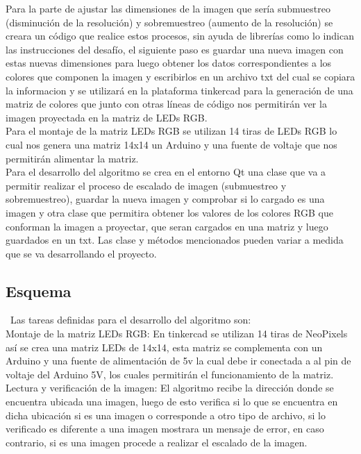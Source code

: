 \documentclass{article}
\begin{document}
Para la parte de ajustar las dimensiones de la imagen que sería submuestreo (disminución de la resolución) y sobremuestreo (aumento de la resolución) se creara un código que realice estos procesos, sin ayuda de librerías como lo indican las instrucciones del desafío, el siguiente paso es guardar una nueva imagen con estas nuevas dimensiones para luego obtener los datos correspondientes a los colores que componen la imagen y escribirlos en un archivo txt del cual se copiara la informacion y se  utilizará en la plataforma tinkercad para la generación de una matriz de colores que junto con otras líneas de código nos permitirán ver la imagen proyectada en la matriz de LEDs RGB.\\

Para el montaje de la matriz LEDs RGB se utilizan 14 tiras de LEDs RGB lo cual nos genera una matriz 14x14 un Arduino y una fuente de voltaje que nos permitirán alimentar la matriz.\\
Para el desarrollo del algoritmo se crea en el entorno Qt una clase que va a permitir realizar el proceso de escalado de imagen (submuestreo y sobremuestreo), guardar la nueva imagen y comprobar si lo cargado es una imagen y otra clase que permitira obtener los valores de los colores RGB que conforman la imagen a proyectar, que seran cargados en una matriz y luego guardados en un txt. Las clase y métodos mencionados pueden variar a medida que se va desarrollando el proyecto.

\subsection{Esquema}
\
Las tareas definidas para el desarrollo del algoritmo son:\\
Montaje de la matriz LEDs RGB: En tinkercad se utilizan 14 tiras de NeoPixels así se crea una matriz LEDs de 14x14, esta matriz se complementa con un Arduino y una fuente de alimentación de 5v la cual debe ir conectada a al pin de voltaje del Arduino 5V, los cuales permitirán el funcionamiento de la matriz.\\

Lectura y verificación de la imagen: El algoritmo recibe la dirección donde se encuentra ubicada una imagen, luego de esto verifica si lo que se encuentra en dicha ubicación si es una imagen o corresponde a otro tipo de archivo, si lo verificado es diferente a una imagen mostrara un mensaje de error, en caso contrario, si es una imagen procede a realizar el escalado de la imagen.\\
\end{document}
